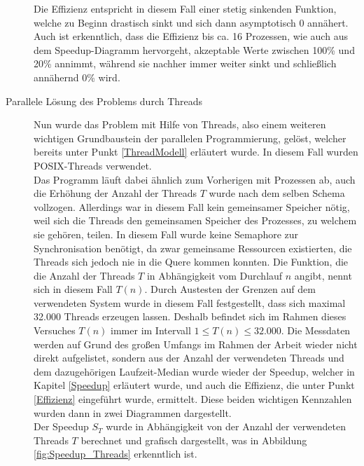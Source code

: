 \begin{description}
						Die Effizienz entspricht in diesem Fall einer stetig sinkenden Funktion, welche zu Beginn drastisch sinkt und sich dann asymptotisch 0 annähert. Auch ist erkenntlich, dass die Effizienz bis ca. 16 Prozessen, wie auch aus dem Speedup-Diagramm hervorgeht, akzeptable Werte zwischen 100\% und 20\% annimmt, während sie nachher immer weiter sinkt und schließlich annähernd 0\% wird.
					
					\item[Parallele Lösung des Problems durch Threads]
						
						Nun wurde das Problem mit Hilfe von Threads, also einem weiteren wichtigen Grundbaustein der parallelen Programmierung, gelöst, welcher bereits unter Punkt \ref{ThreadModell} erläutert wurde. In diesem Fall wurden POSIX-Threads verwendet.\\
						Das Programm läuft dabei ähnlich zum Vorherigen mit Prozessen ab, auch die Erhöhung der Anzahl der Threads $T$ wurde nach dem selben Schema vollzogen. Allerdings war in diesem Fall kein gemeinsamer Speicher nötig, weil sich die Threads den gemeinsamen Speicher des Prozesses, zu welchem sie gehören, teilen. In diesem Fall wurde keine Semaphore zur Synchronisation benötigt, da zwar gemeinsame Ressourcen existierten, die Threads sich jedoch nie in die Quere kommen konnten. Die Funktion, die die Anzahl der Threads $T$ in Abhängigkeit vom Durchlauf $n$ angibt, nennt sich in diesem Fall $T(n)$.
						Durch Austesten der Grenzen auf dem verwendeten System wurde in diesem Fall festgestellt, dass sich maximal 32.000 Threads erzeugen lassen. Deshalb befindet sich im Rahmen dieses Versuches $T(n)$ immer im Intervall $1 \leq T(n) \leq 32.000$.
						Die Messdaten werden auf Grund des großen Umfangs im Rahmen der Arbeit wieder nicht direkt aufgelistet, sondern aus der Anzahl der verwendeten Threads und dem dazugehörigen Laufzeit-Median wurde wieder der Speedup, welcher in Kapitel \ref{Speedup} erläutert wurde, und auch die Effizienz, die unter Punkt \ref{Effizienz} eingeführt wurde, ermittelt. Diese beiden wichtigen Kennzahlen wurden dann in zwei Diagrammen dargestellt.\\
						Der Speedup $S_T$ wurde in Abhängigkeit von der Anzahl der verwendeten Threads $T$ berechnet und grafisch dargestellt, was in Abbildung \ref{fig:Speedup_Threads} erkenntlich ist.
						

\end{description}
